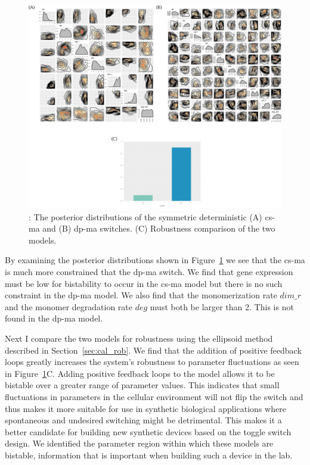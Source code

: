 \begin{figure}[htbp]
\centerfloat
\includegraphics[scale=0.5]{../../chapters/chapterStabilityFinder/images/MA_sym_post.png}
\caption[Robustness comparison of the \acrshort{cs-ma} and \acrshort{dp-ma} switches]{ \label{fig:ma-sym-det-post}: The posterior distributions of the symmetric deterministic (A) \acrshort{cs-ma} and (B) \acrshort{dp-ma} switches. (C) Robustness comparison of the two models. }
\end{figure}
\clearpage

By examining the posterior distributions shown in Figure~\ref{fig:ma-sym-det-post} we see that the \acrshort{cs-ma} is much more constrained that the \acrshort{dp-ma} switch. We find that gene expression must be low for bistability to occur in the \acrshort{cs-ma} model but there is no such constraint in the \acrshort{dp-ma} model. We also find that the monomerization rate $dim\_r$ and the monomer degradation rate $deg$ must both be larger than 2. This is not found in the \acrshort{dp-ma} model. 

Next I compare the two models for robustness using the ellipsoid method described in Section~\ref{sec:cal_rob}. We find that the addition of positive feedback loops greatly increases the system's robustness to parameter fluctuations as seen in Figure~\ref{fig:ma-sym-det-post}C. Adding positive feedback loops to the model allows it to be bistable over a greater range of parameter values. This indicates that small fluctuations in parameters in the cellular environment will not flip the switch and thus makes it more suitable for use in synthetic biological applications where spontaneous and undesired switching might be detrimental. This makes it a better candidate for building new synthetic devices based on the toggle switch design. We identified the parameter region within which these models are bistable, information that is important when building such a device in the lab.

